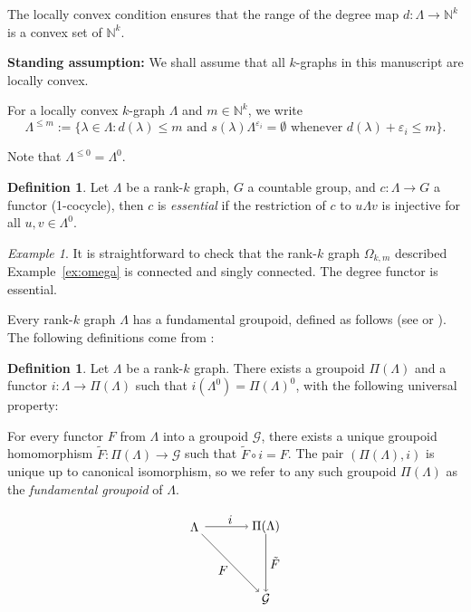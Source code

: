 \documentclass[12pt]{amsart}
\theoremstyle{definition}
\newtheorem{dfn}[thm]{Definition}
\theoremstyle{remark}
\newtheorem{example}[thm]{Example}
\numberwithin{equation}{section}
\newcommand{\NN}{\mathbb{N}}
\newcommand{\Gg}{\mathcal{G}}
\begin{document}
\medskip
\noindent
The locally convex condition ensures that the range of the degree map $d : \Lambda \to \NN^k$ is a convex set of $\NN^k$. \par
\medskip
\textbf{Standing assumption:} We shall assume that all $k$-graphs in this manuscript are locally convex. \par
\medskip
\noindent
For a locally convex $k$-graph $\Lambda$ and 
$m \in \mathbb{N}^k$, we write 
\[
\Lambda^{\leq m} := \{ \lambda \in \Lambda : d(\lambda) \leq m 
\text{ and } s ( \lambda ) \Lambda^{\varepsilon_i} = \emptyset 
\text{ whenever } d  (\lambda ) + \varepsilon_i \leq m \} .
\]

\noindent
Note that $\Lambda^{\le 0} = \Lambda^0$. 


\begin{dfn}\label{def:essential}
Let  $\Lambda$ be a rank-$k$ graph, $G$ a countable group, and $c : \Lambda \to G$ a functor (1-cocycle), then $c$ is \emph{essential} if the restriction of $c$ to $u{\Lambda}v$ is injective for all $u, v \in \Lambda^0$.
\end{dfn}

\begin{example}
It is straightforward to check that the rank-$k$ graph $\Omega_{k,m}$ described Example~\ref{ex:omega} is connected and singly connected. The degree functor is essential.
\end{example}


\noindent
Every rank-$k$ graph $\Lambda$ has a fundamental groupoid, defined as follows (see \cite[Section~19.1]{Schubert} or \cite[Section~3]{PQR1}). The following definitions come from \cite{bkps}:

\begin{dfn}\label{dfn:fundgpd}
Let $\Lambda$ be a rank-$k$ graph. There exists a groupoid $\Pi(\Lambda)$ and a functor $i : \Lambda \to \Pi(\Lambda)$ such that $i(\Lambda^0)=\Pi(\Lambda)^0$, with the following universal property: 

\begin{minipage}[l]{0.7\textwidth}
For every functor $F$ from $\Lambda$ into a groupoid $\Gg$, there exists a unique groupoid homomorphism $\tilde{F} : \Pi(\Lambda) \to \Gg$ such that $\tilde{F} \circ i = F$. The pair $(\Pi(\Lambda), i)$ is unique up to canonical isomorphism, so we refer to any such groupoid $\Pi(\Lambda)$ as the \emph{fundamental groupoid} of $\Lambda$.
\end{minipage}%
\begin{minipage}{0.3\textwidth}
\[
\begin{tikzpicture}

\node[inner sep=0pt,circle] at (2,2) {$\Pi ( \Lambda )$};
\node at (0,2) {$\Lambda$};
\node at (2,0) {${\mathcal G}$};
\node at (1,2.2) {$i$};
\node at (0.8,0.8) {$F$};
\node at (2.25,1) {$\tilde{F}$};

\draw[->] (0.3,2) -- (1.5,2);
\draw[->] (2,1.8) -- (2,0.2);
\draw[->] (0.2,1.8) -- (1.8,0.2);
\end{tikzpicture}
\]
\end{minipage}
\end{dfn}
\end{document}
